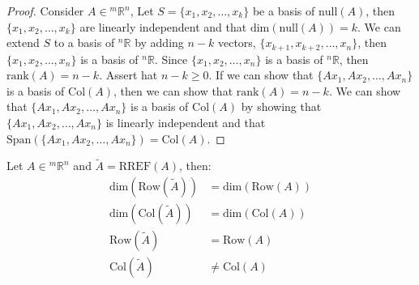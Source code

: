 \documentclass[11pt]{article}
\begin{document}
\begin{proof}
    Consider $A \in {^m\mathbb{R}^n}$, Let $S = \{x_1, x_2, \ldots, x_k\}$ be a basis of $\text{null}(A)$, then $\{x_1, x_2, \ldots, x_k\}$ are linearly independent and that $\text{dim}(\text{null}(A)) = k$. We can extend $S$ to a basis of $^n\mathbb{R}$ by adding $n-k$ vectors, $\{x_{k+1}, x_{k+2}, \ldots, x_n\}$, then $\{x_1, x_2, \ldots, x_n\}$ is a basis of $^n\mathbb{R}$. Since $\{x_1, x_2, \ldots, x_n\}$ is a basis of $^n\mathbb{R}$, then $\text{rank}(A) = n - k$. Assert hat $n-k \ge 0$. If we can show that $\{Ax_1, Ax_2, \ldots, Ax_n\}$ is a basis of $\text{Col}(A)$, then we can show that $\text{rank}(A) = n - k$. We can show that $\{Ax_1, Ax_2, \ldots, Ax_n\}$ is a basis of $\text{Col}(A)$ by showing that $\{Ax_1, Ax_2, \ldots, Ax_n\}$ is linearly independent and that $\text{Span}(\{Ax_1, Ax_2, \ldots, Ax_n\}) = \text{Col}(A)$.
    
\end{proof}
\begin{theorem}
    Let $A \in {^m\mathbb{R}^n}$ and $\tilde{A} = \text{RREF}(A)$, then:
    \begin{align}
        \text{dim}(\text{Row}(\tilde{A})) &= \text{dim}(\text{Row}(A)) \\
        \text{dim}(\text{Col}(\tilde{A})) &= \text{dim}(\text{Col}(A)) \\
        \text{Row}(\tilde{A}) &= \text{Row}(A) \\
        \text{Col}(\tilde{A}) &\neq \text{Col}(A)
    \end{align}
\end{theorem}
\end{document}
